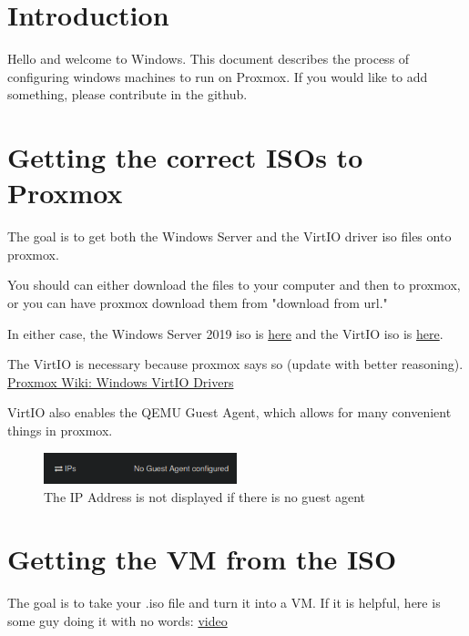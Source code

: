 \documentclass{article}
\begin{document}
\graphicspath{ {./Images/} }
\tableofcontents

\section{Introduction}
Hello and welcome to Windows. This document describes the process of configuring windows machines to run on Proxmox. If you would like to add something, please contribute in the github.

\section{Getting the correct ISOs to Proxmox}
The goal is to get both the Windows Server and the VirtIO driver iso files onto proxmox.

You should can either download the files to your computer and then to proxmox, or you can have proxmox download them from "download from url."

In either case, the Windows Server 2019 iso is \href{http://www.microsoft.com/en-us/evalcenter/download-windows-server-2019
}{here} and the VirtIO iso is \href{https://fedorapeople.org/groups/virt/virtio-win/direct-downloads/stable-virtio/}{here}.

The VirtIO is necessary because proxmox says so (update with better reasoning). \href{https://pve.proxmox.com/wiki/Windows_VirtIO_Drivers#Windows_OS_Support}{Proxmox Wiki: Windows VirtIO Drivers}

VirtIO also enables the QEMU Guest Agent, which allows for many convenient things in proxmox.

\begin{figure}[h]
    \centering
    \includegraphics[width=0.5\textwidth]{noGuestAgent.png}
    \caption{The IP Address is not displayed if there is no guest agent}
    \label{fig:noGuestAgent}
\end{figure}

\section{Getting the VM from the ISO}
The goal is to take your .iso file and turn it into a VM. If it is helpful, here is some guy doing it with no words: \href{https://www.youtube.com/watch?v=lwORpWEHiDE&t=5m}{video} 
\end{document}
